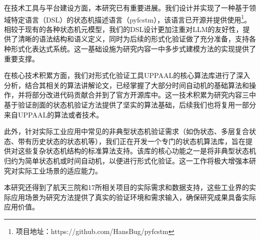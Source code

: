 \begin{table}[htbp]
\centering
{}
\caption{各系统功能安全需求与状态机模型规约数据统计表}
\label{tab:combined_stats}
\end{table}

在技术工具与平台建设方面，本研究已有重要进展。我们设计并实现了一种基于领域特定语言（DSL）的状态机描述语言（pyfcstm），该语言已开源并提供使用\footnote{项目地址：https://github.com/HansBug/pyfcstm}。相较于现有的各种状态机元模型，我们的DSL设计更加注重对LLM的友好性，提供了清晰的语法结构和语义定义，同时为后续的形式化验证做了充分准备，支持各种形式化表达式系统。这一基础设施为研究内容一中多步式建模方法的实现提供了重要支撑。

在核心技术积累方面，我们对形式化验证工具UPPAAL的核心算法库进行了深入分析，结合其相关的算法讲解论文，已经掌握了大部分时间自动机的基础算法和操作，并将部分改进代码贡献合并到了官方开源库中。这一技术积累为研究内容三中基于验证剖面的状态机验证方法提供了坚实的算法基础，后续我们也将复用一部分来自UPPAAL的算法或者技术。

此外，针对实际工业应用中常见的非典型状态机验证需求（如伪状态、多层复合状态、带有历史状态的状态机等），我们正在开发一个专门的状态机算法库，旨在提供对这些复杂状态机结构的标准算法支持。该库的核心功能之一是将非典型状态机归约为简单状态机或时间自动机，以便进行形式化验证。这一工作将极大增强本研究对实际工业场景的适应能力。

本研究还得到了航天三院和17所相关项目的实际需求和数据支持，这些工业界的实际应用场景为研究方法提供了真实的验证环境和需求输入，确保研究成果具备实际应用价值。



